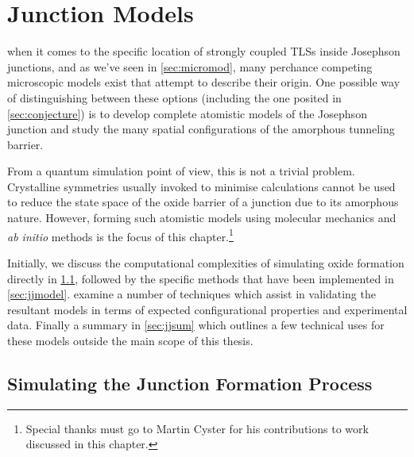 \chapter{Junction Models}\label{ch:junctions}

 when it comes to the specific location of strongly coupled TLSs inside Josephson junctions, and as we've seen in \cref{sec:micromod}, many perchance competing microscopic models exist that attempt to describe their origin.
One possible way of distinguishing between these options (including the one posited in \cref{sec:conjecture}) is to develop complete atomistic models of the Josephson junction and study the many spatial configurations of the amorphous tunneling barrier.

From a quantum simulation point of view, this is not a trivial problem.
Crystalline symmetries usually invoked to minimise calculations cannot be used to reduce the state space of the oxide barrier of a junction due to its amorphous nature.
However, forming such atomistic models using molecular mechanics and \textit{ab initio} methods is the focus of this chapter.\footnote{Special thanks must go to Martin Cyster for his contributions to work discussed in this chapter.}

Initially, we discuss the computational complexities of simulating oxide formation directly in \cref{sec:simjjform}, followed by the specific methods that have been implemented in \cref{sec:jjmodel}.
 examine a number of techniques which assist in validating the resultant models in terms of expected configurational properties and experimental data.
Finally a summary in \cref{sec:jjsum} which outlines a few technical uses for these models outside the main scope of this thesis.

\section{Simulating the Junction Formation Process}\label{sec:simjjform}

